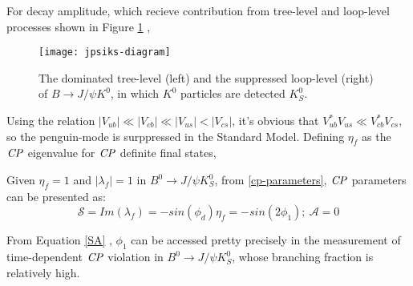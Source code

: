 \begin{comment}
Usually, $S_f$ provides a good sensitivity to $\phi_1$ in Eq(1.42) by replacing $\phi_d$ inside $\lambda_f$ since the rest two equations canceled out the complex phase of $(q/p)$. For instance, in the process of  $b\to \bar{c}cs$ ,the amplitude contributions from tree level and loop level diagram can be written in a form as follows using the CKM unitary condition: 
\end{comment}
For decay amplitude, which recieve contribution from tree-level and loop-level processes shown in Figure \ref{fig:jpsiks} , 

\begin{figure}[htpb]
	\centering
	\texttt{[image: jpsiks-diagram]}
	\caption{The dominated tree-level (left) and the suppressed loop-level (right) of $B\to J/\psi K^0$, in which $K^0$ particles are detected $K_S^0$. \cite{wishahi2014measurement}}
	\label{fig:jpsiks}
\end{figure}


Using the relation $|V_{ub}|\ll |V_{cb}|\ll|V_{us}|<|V_{cs}|$, it's obvious that $V^*_{ub}V_{us} \ll V^*_{cb}V_{cs}$, so the penguin-mode is surppressed in the Standard Model. Defining $\eta_f$ as the $\it{CP}$ eigenvalue for $\it{CP}$ definite final states, 


Given $\eta_f=1$ and $|\lambda_f|=1$ in $B^0 \to J/\psi K^0_S$, from \ref{cp-parameters}, $\it{CP}$ parameters can be presented as: 
\begin{equation}\label{SA}
\mathcal{S} = Im(\lambda_f)
=-sin(\phi_d)\eta_f=-sin(2\phi_1) ; \: \mathcal{A} = 0
\end{equation}

From Equation \ref{SA} , $\phi_1$ can be accessed pretty precisely in the measurement of time-dependent $\it{CP}$ violation in $B^0 \to J/\psi K^0_S$, whose branching fraction is relatively high. 
\begin{comment}
In the $b\to q\bar{q}s$ process where flavor $q$ is not charm, similar to the discussion above, we can extract $\phi_1$ using the same method. Moreover, it provides a penguin-dominated process which is sensitive to the contribution of New Physics, which includes the $B^0_d\to K^0_S K^0_S K^0_S$ decay. In the next section, it's clear that such decay process is important to provide additional insight in seeking the effect beyond the SM (BSM contribution).
\end{comment}



